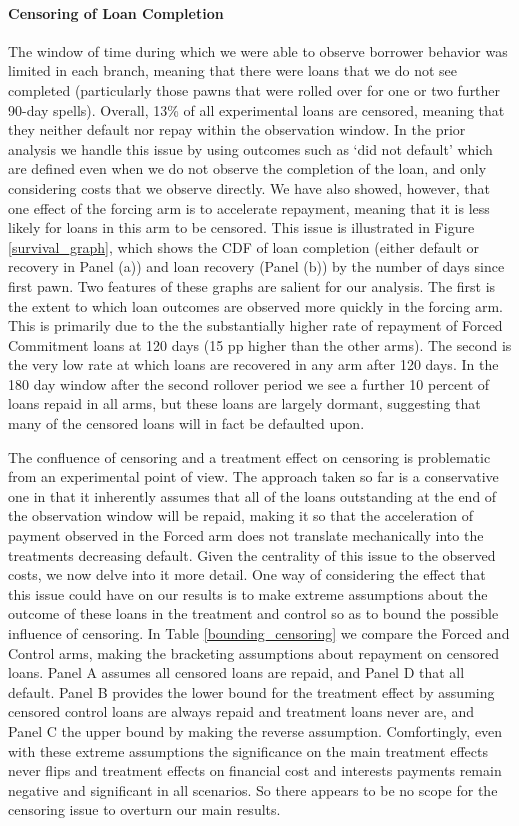 \documentclass[oneside,11pt]{article}
\begin{document}
\paragraph{Censoring of Loan Completion}
The window of time during which we were able to observe borrower behavior was limited in each branch, meaning that there were loans that we do not see completed (particularly those pawns that were rolled over for one or two further 90-day spells).  Overall, 13\% of all experimental loans are censored, meaning that they neither default nor repay within the observation window.  In the prior analysis we handle this issue by using outcomes such as `did not default' which are defined even when we do not observe the completion of the loan, and only considering costs that we observe directly.  We have also showed, however, that one effect of the forcing arm is to accelerate repayment, meaning that it is less likely for loans in this arm to be censored.  This issue is illustrated in Figure \ref{survival_graph}, which shows the CDF of loan completion (either default or recovery in Panel (a)) and loan recovery (Panel (b)) by the number of days since first pawn.  Two features of these graphs are salient for our analysis.  The first is the extent to which loan outcomes are observed more quickly in the forcing arm.  This is primarily due to the the substantially higher rate of repayment of Forced Commitment loans at 120 days (15 pp higher than the other arms).  The second is the very low rate at which loans are recovered in any arm after 120 days.  In the 180 day window after the second rollover period we see a further 10 percent of loans repaid in all arms, but these loans are largely dormant, suggesting that many of the censored loans will in fact be defaulted upon.

The confluence of censoring and a treatment effect on censoring is problematic from an experimental point of view.  The approach taken so far is a conservative one in that it inherently assumes that all of the loans outstanding at the end of the observation window will be repaid, making it so that the acceleration of payment observed in the Forced arm does not translate mechanically into the treatments decreasing default.  Given the centrality of this issue to the observed costs, we now delve into it more detail.  One way of considering the effect that this issue could have on our results is to make extreme assumptions about the outcome of these loans in the treatment and control so as to bound the possible influence of censoring.  In Table \ref{bounding_censoring} we compare the Forced and Control arms, making the bracketing assumptions about repayment on censored loans.  Panel A assumes all censored loans are repaid, and Panel D that all default.  Panel B provides the lower bound for the treatment effect by assuming censored control loans are always repaid and treatment loans never are, and Panel C the upper bound by making the reverse assumption.  Comfortingly, even with these extreme assumptions the significance on the main treatment effects never flips and treatment effects on financial cost and interests payments remain negative and significant in all scenarios.  So there appears to be no scope for the censoring issue to overturn our main results. 
\end{document}
